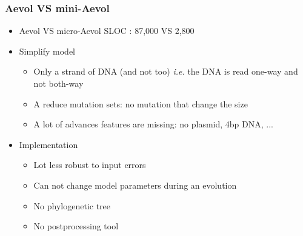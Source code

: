 \documentclass{beamer}
\begin{document}
\begin{frame}
 \frametitle{Aevol VS mini-Aevol}
 \begin{itemize}
  \item Aevol VS micro-Aevol SLOC : 87,000 VS 2,800 
  \vfill
  \item Simplify model
  \begin{itemize}
  \item Only a strand of DNA (and not too) \textit{i.e.} the DNA is read one-way and not both-way
  \item A reduce mutation sets: no mutation that change the size
  \item A lot of advances features are missing: no plasmid, 4bp DNA, ...
  \end{itemize}
  \vfill
  \item Implementation
  \begin{itemize}
   \item Lot less robust to input errors
   \item Can not change model parameters during an evolution
   \item No phylogenetic tree
   \item No postprocessing tool
  \end{itemize}
 \end{itemize}
\end{frame}


%  
\end{document}

